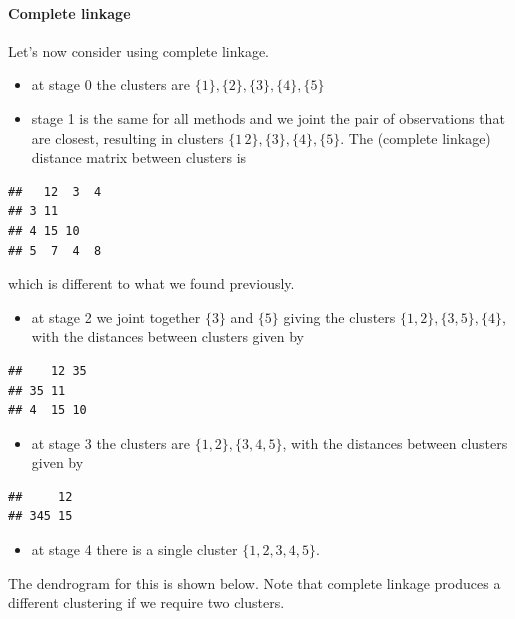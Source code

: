 \documentclass[
]{book}
\providecommand{\tightlist}{%
  \setlength{\itemsep}{0pt}\setlength{\parskip}{0pt}}
\theoremstyle{definition}
\theoremstyle{definition}
\theoremstyle{definition}
\theoremstyle{definition}
\theoremstyle{remark}
\begin{document}
\paragraph*{Complete linkage}\label{complete-linkage}

Let's now consider using complete linkage.

\begin{itemize}
\item
  at stage 0 the clusters are \(\{1\}, \{2\},\{3\},\{4\},\{5\}\)
\item
  stage 1 is the same for all methods and we joint the pair of observations that are closest, resulting in clusters \(\{1\, 2\},\{3\},\{4\},\{5\}\). The (complete linkage) distance matrix between clusters is
\end{itemize}

\begin{verbatim}
##   12  3  4
## 3 11      
## 4 15 10   
## 5  7  4  8
\end{verbatim}

which is different to what we found previously.

\begin{itemize}
\tightlist
\item
  at stage 2 we joint together \(\{3\}\) and \(\{5\}\) giving the clusters \(\{1, 2\},\{3, 5\},\{4\}\), with the distances between clusters given by
\end{itemize}

\begin{verbatim}
##    12 35
## 35 11   
## 4  15 10
\end{verbatim}

\begin{itemize}
\tightlist
\item
  at stage 3 the clusters are \(\{1, 2\},\{3, 4, 5\}\), with the distances between clusters given by
\end{itemize}

\begin{verbatim}
##     12
## 345 15
\end{verbatim}

\begin{itemize}
\tightlist
\item
  at stage 4 there is a single cluster \(\{1, 2, 3, 4, 5\}\).
\end{itemize}

The dendrogram for this is shown below. Note that complete linkage produces a different clustering if we require two clusters.
\end{document}
